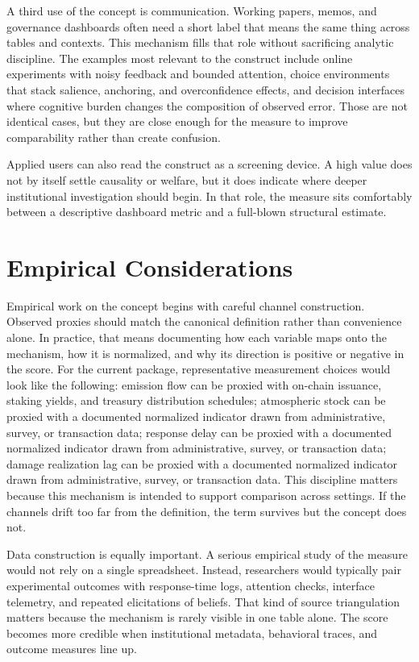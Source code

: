 \documentclass[12pt]{article}
\begin{document}
A third use of the concept is communication. Working papers, memos, and governance dashboards often need a short label that means the same thing across tables and contexts. This mechanism fills that role without sacrificing analytic discipline. The examples most relevant to the construct include online experiments with noisy feedback and bounded attention, choice environments that stack salience, anchoring, and overconfidence effects, and decision interfaces where cognitive burden changes the composition of observed error. Those are not identical cases, but they are close enough for the measure to improve comparability rather than create confusion.

Applied users can also read the construct as a screening device. A high value does not by itself settle causality or welfare, but it does indicate where deeper institutional investigation should begin. In that role, the measure sits comfortably between a descriptive dashboard metric and a full-blown structural estimate.

\section{Empirical Considerations}
Empirical work on the concept begins with careful channel construction. Observed proxies should match the canonical definition rather than convenience alone. In practice, that means documenting how each variable maps onto the mechanism, how it is normalized, and why its direction is positive or negative in the score. For the current package, representative measurement choices would look like the following: emission flow can be proxied with on-chain issuance, staking yields, and treasury distribution schedules; atmospheric stock can be proxied with a documented normalized indicator drawn from administrative, survey, or transaction data; response delay can be proxied with a documented normalized indicator drawn from administrative, survey, or transaction data; damage realization lag can be proxied with a documented normalized indicator drawn from administrative, survey, or transaction data. This discipline matters because this mechanism is intended to support comparison across settings. If the channels drift too far from the definition, the term survives but the concept does not.

Data construction is equally important. A serious empirical study of the measure would not rely on a single spreadsheet. Instead, researchers would typically pair experimental outcomes with response-time logs, attention checks, interface telemetry, and repeated elicitations of beliefs. That kind of source triangulation matters because the mechanism is rarely visible in one table alone. The score becomes more credible when institutional metadata, behavioral traces, and outcome measures line up.
\end{document}
